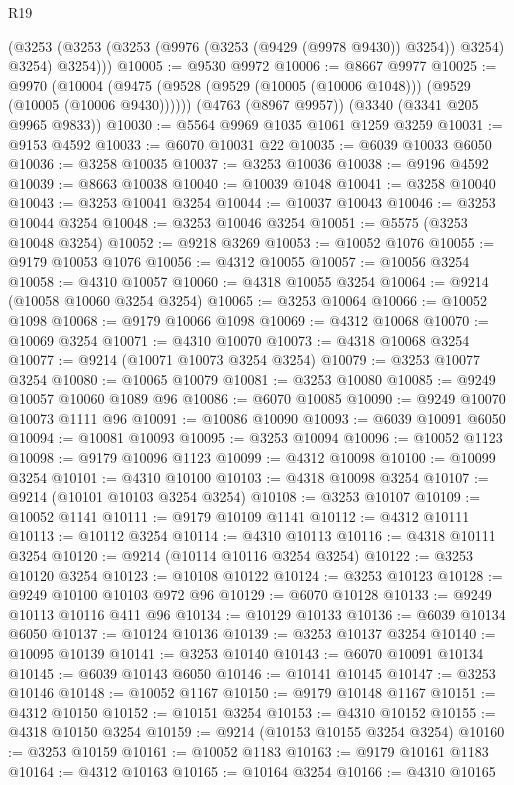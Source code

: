 \begin{lexlean}{R19}
\begin{coremodule}
        (@3253 (@3253 (@3253 (@9976 (@3253 (@9429 (@9978 @9430)) @3254)) @3254) @3254) @3254)))
@10005 := @9530 @9972
@10006 := @8667 @9977
@10025 := @9970
    (@10004 (@9475 (@9528 (@9529 (@10005 (@10006 @1048))) (@9529 (@10005 (@10006 @9430))))))
    (@4763 (@8967 @9957))
    (@3340 (@3341 @205 @9965 @9833))
@10030 := @5564 @9969 @1035 @1061 @1259 @3259
@10031 := @9153 @4592
@10033 := @6070 @10031 @22
@10035 := @6039 @10033 @6050
@10036 := @3258 @10035
@10037 := @3253 @10036
@10038 := @9196 @4592
@10039 := @8663 @10038
@10040 := @10039 @1048
@10041 := @3258 @10040
@10043 := @3253 @10041 @3254
@10044 := @10037 @10043
@10046 := @3253 @10044 @3254
@10048 := @3253 @10046 @3254
@10051 := @5575 (@3253 @10048 @3254)
@10052 := @9218 @3269
@10053 := @10052 @1076
@10055 := @9179 @10053 @1076
@10056 := @4312 @10055
@10057 := @10056 @3254
@10058 := @4310 @10057
@10060 := @4318 @10055 @3254
@10064 := @9214 (@10058 @10060 @3254 @3254)
@10065 := @3253 @10064
@10066 := @10052 @1098
@10068 := @9179 @10066 @1098
@10069 := @4312 @10068
@10070 := @10069 @3254
@10071 := @4310 @10070
@10073 := @4318 @10068 @3254
@10077 := @9214 (@10071 @10073 @3254 @3254)
@10079 := @3253 @10077 @3254
@10080 := @10065 @10079
@10081 := @3253 @10080
@10085 := @9249 @10057 @10060 @1089 @96
@10086 := @6070 @10085
@10090 := @9249 @10070 @10073 @1111 @96
@10091 := @10086 @10090
@10093 := @6039 @10091 @6050
@10094 := @10081 @10093
@10095 := @3253 @10094
@10096 := @10052 @1123
@10098 := @9179 @10096 @1123
@10099 := @4312 @10098
@10100 := @10099 @3254
@10101 := @4310 @10100
@10103 := @4318 @10098 @3254
@10107 := @9214 (@10101 @10103 @3254 @3254)
@10108 := @3253 @10107
@10109 := @10052 @1141
@10111 := @9179 @10109 @1141
@10112 := @4312 @10111
@10113 := @10112 @3254
@10114 := @4310 @10113
@10116 := @4318 @10111 @3254
@10120 := @9214 (@10114 @10116 @3254 @3254)
@10122 := @3253 @10120 @3254
@10123 := @10108 @10122
@10124 := @3253 @10123
@10128 := @9249 @10100 @10103 @972 @96
@10129 := @6070 @10128
@10133 := @9249 @10113 @10116 @411 @96
@10134 := @10129 @10133
@10136 := @6039 @10134 @6050
@10137 := @10124 @10136
@10139 := @3253 @10137 @3254
@10140 := @10095 @10139
@10141 := @3253 @10140
@10143 := @6070 @10091 @10134
@10145 := @6039 @10143 @6050
@10146 := @10141 @10145
@10147 := @3253 @10146
@10148 := @10052 @1167
@10150 := @9179 @10148 @1167
@10151 := @4312 @10150
@10152 := @10151 @3254
@10153 := @4310 @10152
@10155 := @4318 @10150 @3254
@10159 := @9214 (@10153 @10155 @3254 @3254)
@10160 := @3253 @10159
@10161 := @10052 @1183
@10163 := @9179 @10161 @1183
@10164 := @4312 @10163
@10165 := @10164 @3254
@10166 := @4310 @10165

\end{coremodule}
\end{lexlean}
